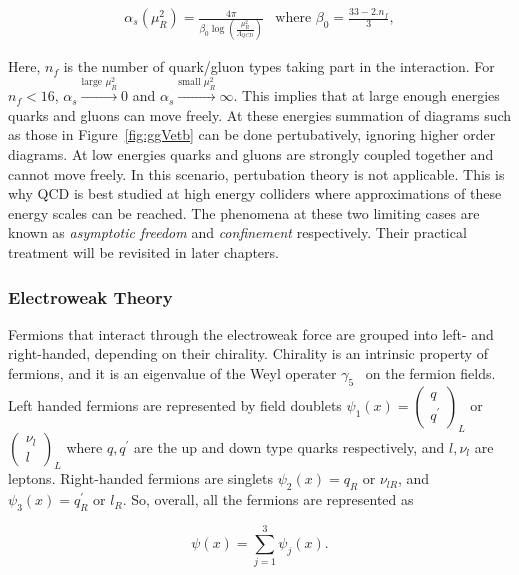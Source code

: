 \begin{equation}
\begin{aligned}
\alpha_s(\mu^2_R) = \frac{4\pi}{\beta_0\log\left ( \frac{\mu^2_R}{\Lambda_{QCD}}\right )} & \text{where } \beta_0 = \frac{33 - 2.n_f}{3},
\end{aligned}
\end{equation}  

Here, $n_f$ is the number of quark/gluon types 
taking part in the interaction. For $n_f<16$, $\alpha_s\xrightarrow{\text{large }\mu^2_R} 0$ and 
$\alpha_s\xrightarrow{\text{small }\mu^2_R} \infty$. This implies that at large enough  
energies quarks and gluons can move freely. At these energies summation of diagrams such 
as those in Figure~\ref{fig:ggVetb} can be done pertubatively, ignoring higher order diagrams.  
At low energies quarks and gluons are strongly coupled together and 
cannot move freely. In this scenario, pertubation theory is not applicable. 
This is why QCD is best studied at high energy colliders where approximations 
of these energy scales can be reached. The phenomena at these two limiting cases are known 
as {\it asymptotic freedom} and {\it confinement} respectively. Their practical treatment 
will be revisited in later chapters.   

\subsubsection{Electroweak Theory}
\par Fermions that interact through the electroweak force are grouped into left- and right-handed, 
depending on their chirality. Chirality is an intrinsic property of fermions, and it is an 
eigenvalue of the Weyl operater $\gamma_5$~\cite{2015arXiv150308956D} on the fermion fields. 
Left handed fermions are represented by field doublets 
$\psi_1(x) = \left ( \begin{smallmatrix} q \\ q^{'} \end{smallmatrix} \right )_L$ or 
$\left ( \begin{smallmatrix} \nu_l \\ l \end{smallmatrix} \right )_L$ where $q, q^{'}$ are the up and down type quarks
respectively, and $l, \nu_l$ are leptons. Right-handed fermions are singlets 
$\psi_2(x) = q_R$ or $\nu_{lR}$, and $\psi_3(x) = q^{'}_R$ or $l_R$. So, overall, all the fermions are represented 
as 

\begin{equation}
\psi(x) = \sum_{j=1}^3 \psi_j(x).
\end{equation}

